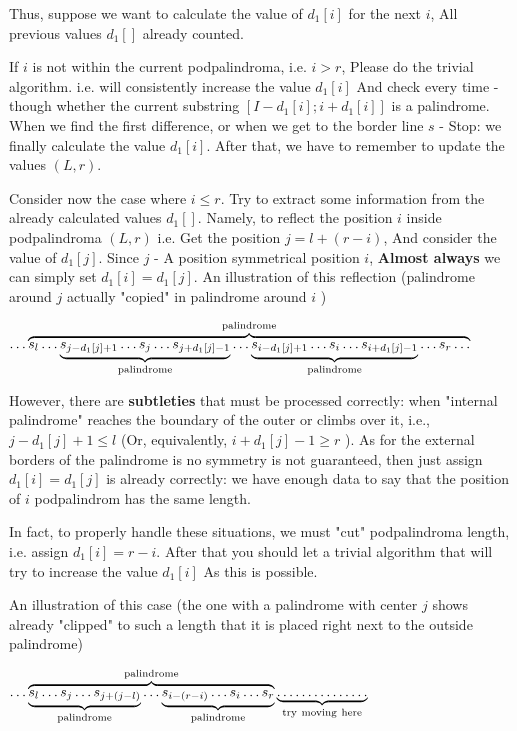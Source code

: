 Thus, suppose we want to calculate the value of $d_1 [i]$ for the next $i$, All previous values $d_1 []$ already counted.

If $i$ is not within the current podpalindroma, i.e. $i> r$, Please do the trivial algorithm.
i.e. will consistently increase the value $d_1 [i]$ And check every time - though whether the current substring $[I-d_1 [i]; i + d_1 [i]]$ is a palindrome. When we find the first difference, or when we get to the border line $s$ - Stop: we finally calculate the value $d_1 [i]$. After that, we have to remember to update the values $(L, r)$.

Consider now the case where $i \le r$.
Try to extract some information from the already calculated values $d_1 []$. Namely, to reflect the position $i$ inside podpalindroma $(L, r)$ i.e. Get the position $j = l + (r - i)$, And consider the value of $d_1 [j]$. Since $j$ - A position symmetrical position $i$, \textbf{Almost always} we can simply set $d_1 [i] = d_1 [j]$. An illustration of this reflection (palindrome around $j$ actually "copied" in palindrome around $i$ )

$\ldots\overbrace{s_{l}\ldots\underbrace{s_{j-d_{1}[j]+1}\ldots s_{j}\ldots s_{j+d_{1}[j]-1}}_{{\rm palindrome}}\ldots\underbrace{s_{i-d_{1}[j]+1}\ldots s_{i}\ldots s_{i+d_{1}[j]-1}}_{{\rm palindrome}}\ldots s_{r}\ldots}^{{\rm palindrome}}$

However, there are \textbf{subtleties} that must be processed correctly: when "internal palindrome" reaches the boundary of the outer or climbs over it, i.e., $j-d_1 [j] +1 \le l$ (Or, equivalently, $i + d_1 [j] -1 \ge r$ ). As for the external borders of the palindrome is no symmetry is not guaranteed, then just assign $d_1 [i] = d_1 [j]$ is already correctly: we have enough data to say that the position of $i$ podpalindrom has the same length.

In fact, to properly handle these situations, we must "cut" podpalindroma length, i.e. assign $d_1 [i] = r - i$. After that you should let a trivial algorithm that will try to increase the value $d_1 [i]$ As this is possible.

An illustration of this case (the one with a palindrome with center $j$ shows already "clipped" to such a length that it is placed right next to the outside palindrome)

$\ldots\overbrace{\underbrace{s_{l}\ldots s_{j}\ldots s_{j+(j-l)}}_{{\rm palindrome}}\ldots\underbrace{s_{i-(r-i)}\ldots s_{i}\ldots s_{r}}_{{\rm palindrome}}}^{{\rm palindrome}}\underbrace{\ldots\ldots\ldots\ldots\ldots}_{{\rm try\ }{\rm moving\ }{\rm here}}$


